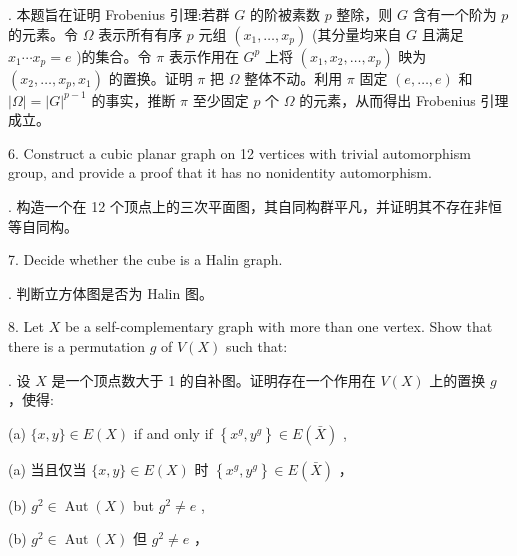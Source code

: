 \documentclass[10pt]{article}
\begin{document}
\begin{tcolorbox}. 本题旨在证明 Frobenius 引理:若群 \(G\) 的阶被素数 \(p\) 整除，则 \(G\) 含有一个阶为 \(p\) 的元素。令 \(\Omega\) 表示所有有序 \(p\) 元组 \(\left( {{x}_{1},\ldots ,{x}_{p}}\right)\) (其分量均来自 \(G\) 且满足 \({x}_{1}\cdots {x}_{p} = e\) )的集合。令 \(\pi\) 表示作用在 \({G}^{p}\) 上将 \(\left( {{x}_{1},{x}_{2},\ldots ,{x}_{p}}\right)\) 映为 \(\left( {{x}_{2},\ldots ,{x}_{p},{x}_{1}}\right)\) 的置换。证明 \(\pi\) 把 \(\Omega\) 整体不动。利用 \(\pi\) 固定 \(\left( {e,\ldots ,e}\right)\) 和 \(\left| \Omega \right|  = {\left| G\right| }^{p - 1}\) 的事实，推断 \(\pi\) 至少固定 \(p\) 个 \(\Omega\) 的元素，从而得出 Frobenius 引理成立。
\end{tcolorbox}

6. Construct a cubic planar graph on 12 vertices with trivial automorphism group, and provide a proof that it has no nonidentity automorphism.

\begin{tcolorbox}. 构造一个在 12 个顶点上的三次平面图，其自同构群平凡，并证明其不存在非恒等自同构。
\end{tcolorbox}

7. Decide whether the cube is a Halin graph.

\begin{tcolorbox}. 判断立方体图是否为 Halin 图。
\end{tcolorbox}

8. Let \(X\) be a self-complementary graph with more than one vertex. Show that there is a permutation \(g\) of \(V\left( X\right)\) such that:

\begin{tcolorbox}. 设 \(X\) 是一个顶点数大于 1 的自补图。证明存在一个作用在 \(V\left( X\right)\) 上的置换 \(g\) ，使得:
\end{tcolorbox}

(a) \(\{ x,y\}  \in  E\left( X\right)\) if and only if \(\left\{  {{x}^{g},{y}^{g}}\right\}   \in  E\left( \bar{X}\right)\) ,

\begin{tcolorbox}\relax
(a) 当且仅当 \(\{ x,y\}  \in  E\left( X\right)\) 时 \(\left\{  {{x}^{g},{y}^{g}}\right\}   \in  E\left( \bar{X}\right)\) ，
\end{tcolorbox}

(b) \({g}^{2} \in  \operatorname{Aut}\left( X\right)\) but \({g}^{2} \neq  e\) ,

\begin{tcolorbox}\relax
(b) \({g}^{2} \in  \operatorname{Aut}\left( X\right)\) 但 \({g}^{2} \neq  e\) ，
\end{tcolorbox}
\end{document}
